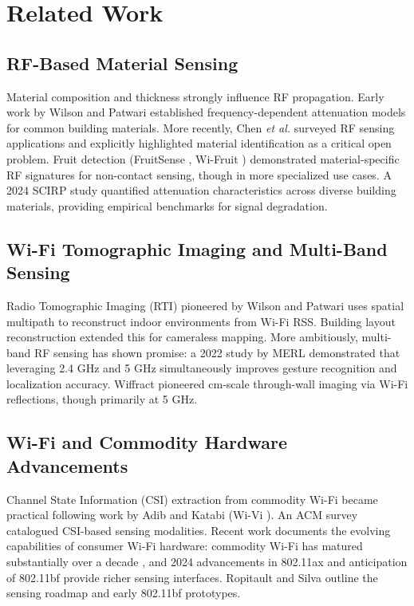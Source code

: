 \documentclass[conference]{IEEEtran}
\begin{document}
\section{Related Work}

\subsection{RF-Based Material Sensing}

Material composition and thickness strongly influence RF propagation. Early work by Wilson and Patwari \cite{wilson-propagation-losses-2002} established frequency-dependent attenuation models for common building materials. More recently, Chen \emph{et al.} \cite{chen-comst-2025} surveyed RF sensing applications and explicitly highlighted material identification as a critical open problem. Fruit detection (FruitSense \cite{tan-fruitsense-2018}, Wi-Fruit \cite{wi-fruit-imwut-2021}) demonstrated material-specific RF signatures for non-contact sensing, though in more specialized use cases. A 2024 SCIRP study \cite{scirp-building-materials-2024} quantified attenuation characteristics across diverse building materials, providing empirical benchmarks for signal degradation.

\subsection{Wi-Fi Tomographic Imaging and Multi-Band Sensing}

Radio Tomographic Imaging (RTI) pioneered by Wilson and Patwari \cite{wilson-rti-2010} uses spatial multipath to reconstruct indoor environments from Wi-Fi RSS. Building layout reconstruction \cite{building-layout-reconstruction-2021} extended this for cameraless mapping. More ambitiously, multi-band RF sensing has shown promise: a 2022 study by MERL \cite{merl-multi-band-2022} demonstrated that leveraging 2.4 GHz and 5 GHz simultaneously improves gesture recognition and localization accuracy. Wiffract \cite{wiffract-mobicon-2022, wiffract-radarconf-2023} pioneered cm-scale through-wall imaging via Wi-Fi reflections, though primarily at 5 GHz.

\subsection{Wi-Fi and Commodity Hardware Advancements}

Channel State Information (CSI) extraction from commodity Wi-Fi became practical following work by Adib and Katabi (Wi-Vi \cite{adib-wi-vi-sigcomm-2013}). An ACM survey \cite{wifi-csi-survey-acm-2019} catalogued CSI-based sensing modalities. Recent work documents the evolving capabilities of consumer Wi-Fi hardware: commodity Wi-Fi has matured substantially over a decade \cite{commodity-wifi-10-years-2022}, and 2024 advancements \cite{commodity-wifi-advancements-2024} in 802.11ax and anticipation of 802.11bf \cite{802-11bf-overview-2024} provide richer sensing interfaces. Ropitault and Silva \cite{ropitault-silva-802-11bf-2024} outline the sensing roadmap and early 802.11bf prototypes.
\end{document}
